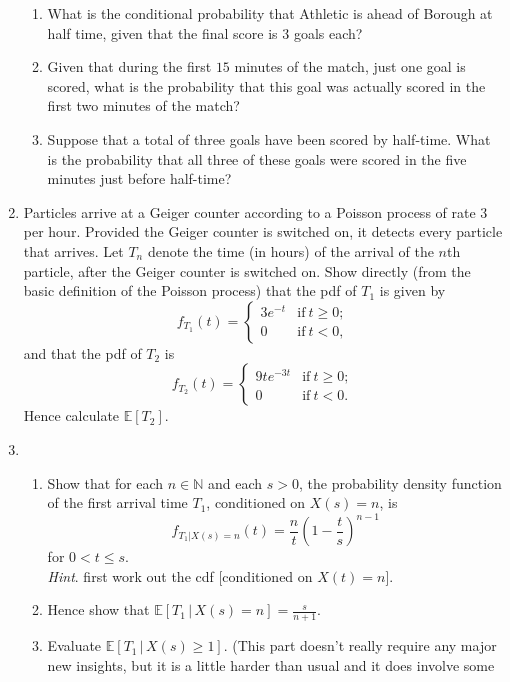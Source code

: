 \documentclass[11pt,a4paper]{article}
\begin{document}
\begin{enumerate}
\begin{enumerate}
            \item What is the conditional probability that Athletic is ahead of Borough at half time, given that the final score is $3$ goals each?
            \item Given that during the first $15$ minutes of the match, just one goal is scored, what is the probability that this goal was actually scored in the first two minutes of the match?
            \item Suppose that a total of three goals have been scored by half-time. What is the probability that all three of these goals were scored in the five minutes just before half-time?
        \end{enumerate}
        \item Particles arrive at a Geiger counter according to a Poisson process of rate $3$ per hour. Provided the Geiger counter is switched on, it detects every particle that arrives. Let $T_n$ denote the time (in hours) of the arrival of the $n$th particle, after the Geiger counter is switched on. Show directly (from the basic definition of the Poisson process) that the pdf of $T_1$ is given by
        $$
        f_{T_1}(t)
        =
        \begin{cases}
            3e^{-t} & \text{if}\ t \geq 0;\\
            0 & \text{if}\ t < 0,
        \end{cases}
        $$
        and that the pdf of $T_2$ is
        $$
        f_{T_2}(t)
        =
        \begin{cases}
            9te^{-3t} & \text{if}\ t \geq 0;\\
            0 & \text{if}\ t < 0.
        \end{cases}
        $$
        Hence calculate $\mathbb{E}[T_2]$.
        \item 
        \begin{enumerate}
            \item Show that for each $n \in \mathbb{N}$ and each $s > 0$, the probability density function of the first arrival time $T_1$, conditioned on $X(s) = n$, is
            $$
            f_{T_1|X(s)=n}(t) = \frac{n}{t}\left(1 - \frac{t}{s}\right)^{n-1}
            $$
            for $0 < t \leq s$.\\
            \textit{Hint}. first work out the cdf [conditioned on $X(t) = n$].
            \item Hence show that $\mathbb{E}[T_1\, | \, X(s)= n] = \frac{s}{n+1}$.
            \item  Evaluate $\mathbb{E}[T_1\, |\, X(s) \geq 1]$. (This part doesn’t really require any major new insights, but it is a little harder than usual and it does involve some

\end{enumerate}
\end{enumerate}
\end{document}
